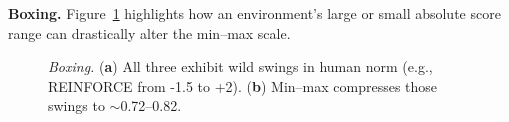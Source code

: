 \noindent \textbf{Boxing.} Figure~\ref{fig:boxing_combined} highlights how an environment's large or small absolute score range can drastically alter the min--max scale.
\begin{figure} 
	\centering
	\quad
	\caption{\emph{Boxing.}
		(\textbf{a}) All three exhibit wild swings in human norm (e.g., REINFORCE from -1.5 to +2).
		(\textbf{b}) Min--max compresses those swings to $\sim$\num{0.72}--\num{0.82}.}
	\label{fig:boxing_combined}
\end{figure}

\medskip

